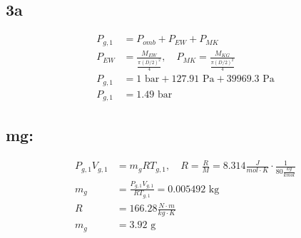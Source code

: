

\subsection*{3a}
\begin{align*}
P_{g,1} &= P_{omb} + P_{EW} + P_{MK} \\
P_{EW} &= \frac{M_{EW}}{\frac{\pi (D/2)^2}{4}}, \quad P_{MK} = \frac{M_{KG}}{\frac{\pi (D/2)^2}{4}} \\
P_{g,1} &= 1 \text{ bar} + 127.91 \text{ Pa} + 39969.3 \text{ Pa} \\
P_{g,1} &= 1.49 \text{ bar}
\end{align*}

\subsection*{mg:}
\begin{align*}
P_{g,1} V_{g,1} &= m_{g} R T_{g,1}, \quad R = \frac{R}{M} = 8.314 \frac{J}{mol \cdot K} \cdot \frac{1}{80 \frac{kg}{kmol}} \\
m_{g} &= \frac{P_{g,1} V_{g,1}}{R T_{g,1}} = 0.005492 \text{ kg} \\
R &= 166.28 \frac{N \cdot m}{kg \cdot K} \\
m_{g} &= 3.92 \text{ g}
\end{align*}